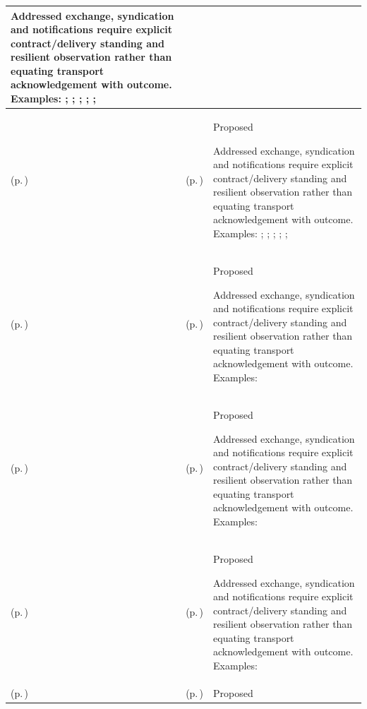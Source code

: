 \begin{longtable}{|>{\raggedright\arraybackslash}p{0.27\TableWidth}|>{\raggedright\arraybackslash}p{0.27\TableWidth}|>{\raggedright\arraybackslash}p{0.46\TableWidth}|}
Addressed exchange, syndication and notifications require explicit contract/delivery standing and resilient observation rather than equating transport acknowledgement with outcome. Examples: \nameref{feature:feat-sa-27}; \nameref{feature:feat-sa-28}; \nameref{feature:feat-sa-29}; \nameref{function:distribute-clinical-communication}; \nameref{service:secure-clinical-message-dispatch}; \nameref{function:track-business-delivery-acknowledgement}\\\hline
\nameref{cap:bec-clinical-communication-administration} (p.\,\pageref{cap:bec-clinical-communication-administration}) & \nameref{cap:ec-12} (p.\,\pageref{cap:ec-12}) & Proposed

Addressed exchange, syndication and notifications require explicit contract/delivery standing and resilient observation rather than equating transport acknowledgement with outcome. Examples: \nameref{feature:feat-sa-27}; \nameref{feature:feat-sa-28}; \nameref{feature:feat-sa-29}; \nameref{function:distribute-clinical-communication}; \nameref{service:secure-clinical-message-dispatch}; \nameref{function:track-business-delivery-acknowledgement}\\\hline
\nameref{cap:bec-population-health-notification-enablement} (p.\,\pageref{cap:bec-population-health-notification-enablement}) & \nameref{cap:ec-08} (p.\,\pageref{cap:ec-08}) & Proposed

Addressed exchange, syndication and notifications require explicit contract/delivery standing and resilient observation rather than equating transport acknowledgement with outcome. Examples: \nameref{feature:population-notification-obligation-tracking}\\\hline
\nameref{cap:bec-population-health-notification-enablement} (p.\,\pageref{cap:bec-population-health-notification-enablement}) & \nameref{cap:ec-09} (p.\,\pageref{cap:ec-09}) & Proposed

Addressed exchange, syndication and notifications require explicit contract/delivery standing and resilient observation rather than equating transport acknowledgement with outcome. Examples: \nameref{feature:population-notification-obligation-tracking}\\\hline
\nameref{cap:bec-population-health-notification-enablement} (p.\,\pageref{cap:bec-population-health-notification-enablement}) & \nameref{cap:ec-12} (p.\,\pageref{cap:ec-12}) & Proposed

Addressed exchange, syndication and notifications require explicit contract/delivery standing and resilient observation rather than equating transport acknowledgement with outcome. Examples: \nameref{feature:population-notification-obligation-tracking}\\\hline
\nameref{cap:bec-primary-care} (p.\,\pageref{cap:bec-primary-care}) & \nameref{cap:ec-02} (p.\,\pageref{cap:ec-02}) & Proposed


\end{longtable}
